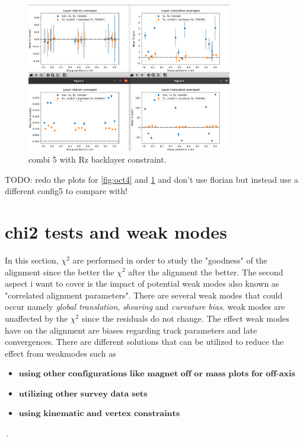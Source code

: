 \begin{figure}
  \centering
  \includegraphics[width=0.8\textwidth]{plots/oct_6/combi5_added_RZ_backlayer.png}
  \caption{combi 5 with Rz backlayer constraint.}
  \label{fig:oct6}
\end{figure}

TODO: redo the plots for \ref{fig:oct4} and \ref{fig:oct6} and don't use florian but instead use a different config5 to compare with!

\section{chi2 tests and weak modes}
In this section, $\chi^2$ are performed in order to study the "goodness" of the alignment since the better the $\chi^2$ after the alignment the better.
The second aspect i want to cover is the impact of potential weak modes also known as "correlated alignment parameters". There are several weak modes that could occur namely \textit{global translation}, \textit{shearing} and \textit{curvature bias}.
weak modes are unaffected by the $\chi^2$ since the residuals do not change.
The effect weak modes have on the alignment are biases regarding track parameters and late convergences.
There are different solutions that can be utilized to reduce the effect from weakmodes such as
\begin{itemize}
  \item $\textbf{using other configurations like magnet off or mass plots for off-axis events}$
  \item $\textbf{utilizing other survey data sets}$
  \item $\textbf{using kinematic and vertex constraints}$
\end{itemize}\,.

